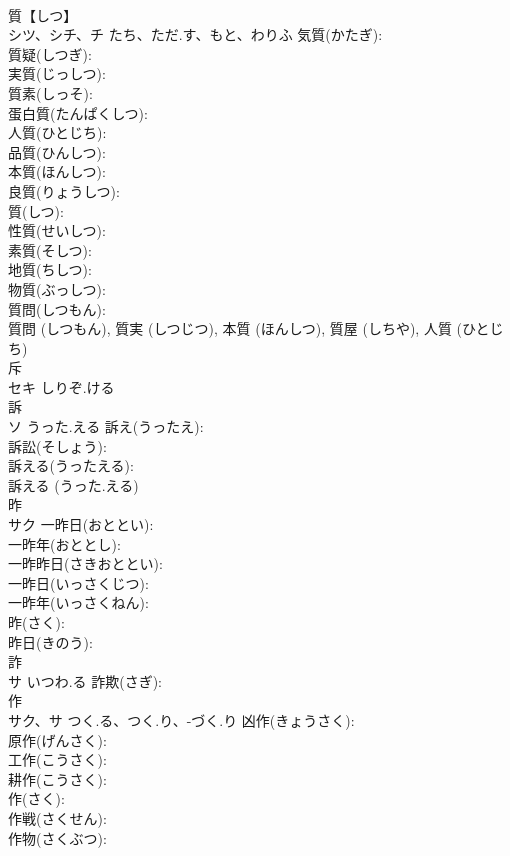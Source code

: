\documentclass[8pt]{extreport}
\begin{document}
\begin{CJK}{UTF8}{min}
\\	質【しつ】 
\\	シツ、シチ、チ	たち、ただ.す、もと、わりふ	気質(かたぎ): 
\\	質疑(しつぎ): 
\\	実質(じっしつ): 
\\	質素(しっそ): 
\\	蛋白質(たんぱくしつ): 
\\	人質(ひとじち): 
\\	品質(ひんしつ): 
\\	本質(ほんしつ): 
\\	良質(りょうしつ): 
\\	質(しつ): 
\\	性質(せいしつ): 
\\	素質(そしつ): 
\\	地質(ちしつ): 
\\	物質(ぶっしつ): 
\\	質問(しつもん): 
\\	質問 (しつもん), 質実 (しつじつ), 本質 (ほんしつ), 質屋 (しちや), 人質 (ひとじち)
\\	斥			
\\	セキ	しりぞ.ける		
\\	訴			
\\	ソ	うった.える	訴え(うったえ): 
\\	訴訟(そしょう): 
\\	訴える(うったえる): 
\\	訴える (うった.える)
\\	昨			
\\	サク		一昨日(おととい): 
\\	一昨年(おととし): 
\\	一昨昨日(さきおととい): 
\\	一昨日(いっさくじつ): 
\\	一昨年(いっさくねん): 
\\	昨(さく): 
\\	昨日(きのう): 
\\	詐			
\\	サ	いつわ.る	詐欺(さぎ): 
\\	作			
\\	サク、サ	つく.る、つく.り、-づく.り	凶作(きょうさく): 
\\	原作(げんさく): 
\\	工作(こうさく): 
\\	耕作(こうさく): 
\\	作(さく): 
\\	作戦(さくせん): 
\\	作物(さくぶつ): 

\end{CJK}
\end{document}
